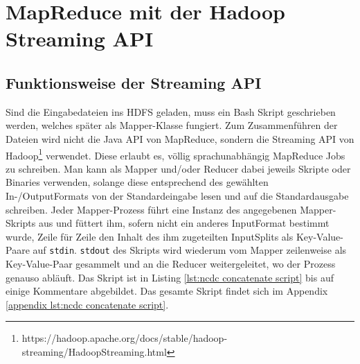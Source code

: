 \section{MapReduce mit der Hadoop Streaming API}
\label{chap:fund sec:core sub:handson mapred streaming}
\subsection{Funktionsweise der Streaming API}
Sind die Eingabedateien ins HDFS geladen, muss ein Bash Skript geschrieben werden, welches später als Mapper-Klasse fungiert. Zum Zusammenführen der Dateien wird nicht die Java API von MapReduce, sondern die Streaming API von Hadoop\footnote{https://hadoop.apache.org/docs/stable/hadoop-streaming/HadoopStreaming.html} verwendet. Diese erlaubt es, völlig sprachunabhängig MapReduce Jobs zu schreiben. Man kann als Mapper und/oder Reducer dabei jeweils Skripte oder Binaries verwenden, solange diese entsprechend des gewählten In-/OutputFormats von der Standardeingabe lesen und auf die Standardausgabe schreiben. Jeder Mapper-Prozess führt eine Instanz des angegebenen Mapper-Skripts aus und füttert ihm, sofern nicht ein anderes InputFormat bestimmt wurde, Zeile für Zeile den Inhalt des ihm zugeteilten InputSplits als Key-Value-Paare auf \verb|stdin|. \verb|stdout| des Skripts wird wiederum vom Mapper zeilenweise als Key-Value-Paar gesammelt und an die Reducer weitergeleitet, wo der Prozess genauso abläuft. Das Skript ist in Listing \ref{lst:ncdc concatenate script} bis auf einige Kommentare abgebildet. Das gesamte Skript findet sich im Appendix \ref{appendix lst:ncdc concatenate script}.    



